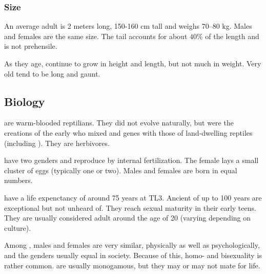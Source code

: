 \subsubsection{Size}
An average adult \scatha{} is 2 meters long, 150-160 cm tall and weighs 70--80 kg. 
Males and females are the same size. 
The tail accounts for about $40\%$ of the length and is not prehensile. 

As they age, \scathae{} continue to grow in height and length, but not much in weight. Very old \scathae{} tend to be long and gaunt. 









\subsection{Biology}

\Scathae{} are warm-blooded reptilians. They did not evolve naturally, but were the creations of the early \dragonlords{} who mixed \dragon{} and \naga{} genes with those of land-dwelling reptiles (including \nycans{}). They are herbivores. 

\Scathae{} have two genders and reproduce by internal fertilization. The female lays a small cluster of eggs (typically one or two). Males and females are born in equal numbers. 

\Scathae{} have a life expenctancy of around 75 years at TL3. Ancient \scathae{} of up to 100 years are exceptional but not unheard of. They reach sexual maturity in their early teens. They are usually considered adult around the age of 20 (varying depending on culture). 

Among \scathae{}, males and females are very similar, physically as well as psychologically, and the genders usually equal in society. Because of this, homo- and bisexuality is rather common. \Scathae{} are usually monogamous, but they may or may not mate for life.  





